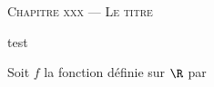 \documentclass[a4paper]{article}
\begin{document}
\begin{center}
  {\scshape\LARGE Chapitre xxx --- Le titre\par}
\end{center}
 
\begin{activite}{}{} 
test
\end{activite}


\begin{definition}{}{}
    Soit $f$ la fonction définie sur $\R$ par 
\end{definition}

\begin{propriete}{}{}  
\end{propriete}

\begin{exercices}{}{}
\end{exercices}


  
\end{document}
